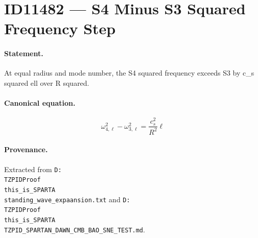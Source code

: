 \section*{ID11482 --- S4 Minus S3 Squared Frequency Step}

\paragraph{Statement.}
At equal radius and mode number, the S4 squared frequency exceeds S3 by c_s squared ell over R squared.

\paragraph{Canonical equation.}
\[
\omega_{4,\ell}^2-\omega_{3,\ell}^2=\frac{c_s^2}{R^2}\ell
\]

\paragraph{Provenance.}
Extracted from \texttt{D:\\TZPIDProof\\this\_is\_SPARTA\\standing\_wave\_expaansion.txt} and \texttt{D:\\TZPIDProof\\this\_is\_SPARTA\\TZPID\_SPARTAN\_DAWN\_CMB\_BAO\_SNE\_TEST.md}.
